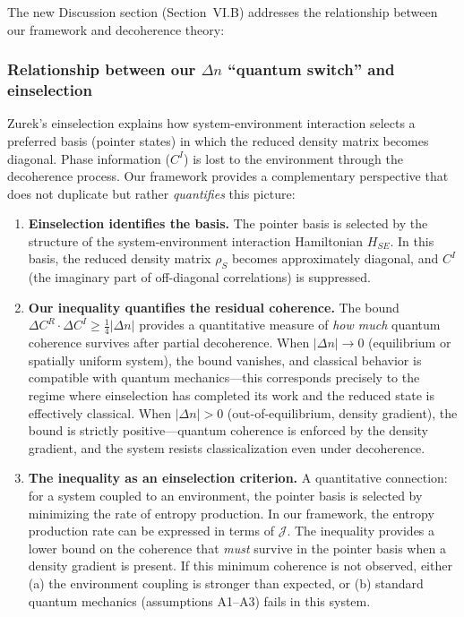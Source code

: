 \documentclass[11pt,a4paper]{article}
\begin{document}
The new Discussion section (Section~VI.B) addresses the relationship between our framework and decoherence theory:

\subsubsection*{Relationship between our $\Delta n$ ``quantum switch'' and einselection}

Zurek's einselection explains how system-environment interaction selects a preferred basis (pointer states) in which the reduced density matrix becomes diagonal. Phase information ($C^I$) is lost to the environment through the decoherence process. Our framework provides a complementary perspective that does not duplicate but rather \emph{quantifies} this picture:

\begin{enumerate}[leftmargin=*]
\item \textbf{Einselection identifies the basis.} The pointer basis is selected by the structure of the system-environment interaction Hamiltonian $H_{SE}$. In this basis, the reduced density matrix $\rho_S$ becomes approximately diagonal, and $C^I$ (the imaginary part of off-diagonal correlations) is suppressed.

\item \textbf{Our inequality quantifies the residual coherence.} The bound $\Delta C^R \cdot \Delta C^I \geq \frac{1}{4}|\Delta n|$ provides a quantitative measure of \emph{how much} quantum coherence survives after partial decoherence. When $|\Delta n| \to 0$ (equilibrium or spatially uniform system), the bound vanishes, and classical behavior is compatible with quantum mechanics---this corresponds precisely to the regime where einselection has completed its work and the reduced state is effectively classical. When $|\Delta n| > 0$ (out-of-equilibrium, density gradient), the bound is strictly positive---quantum coherence is enforced by the density gradient, and the system resists classicalization even under decoherence.

\item \textbf{The inequality as an einselection criterion.} A quantitative connection: for a system coupled to an environment, the pointer basis is selected by minimizing the rate of entropy production. In our framework, the entropy production rate can be expressed in terms of $\mathcal{J}$. The inequality provides a lower bound on the coherence that \emph{must} survive in the pointer basis when a density gradient is present. If this minimum coherence is not observed, either (a) the environment coupling is stronger than expected, or (b) standard quantum mechanics (assumptions A1--A3) fails in this system.


\end{enumerate}
\end{document}
